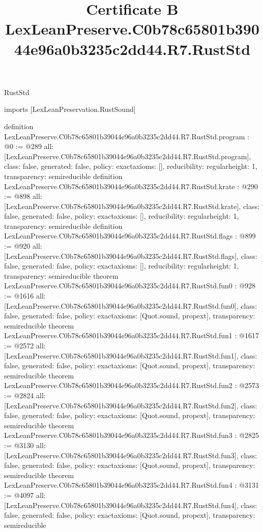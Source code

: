 \begin{lexlean}{RustStd}
\title{Certificate B LexLeanPreserve.C0b78c65801b39044e96a0b3235c2dd44.R7.RustStd}
\begin{coremodule}
imports [LexLeanPreservation.RustSound]

definition LexLeanPreserve.C0b78c65801b39044e96a0b3235c2dd44.R7.RustStd.program : @0 := @289 {
  all: [LexLeanPreserve.C0b78c65801b39044e96a0b3235c2dd44.R7.RustStd.program],
  class: false,
  generated: false,
  policy: exact{axioms: []},
  reducibility: regular{height: 1},
  transparency: semireducible
}
definition LexLeanPreserve.C0b78c65801b39044e96a0b3235c2dd44.R7.RustStd.krate : @290 := @898 {
  all: [LexLeanPreserve.C0b78c65801b39044e96a0b3235c2dd44.R7.RustStd.krate],
  class: false,
  generated: false,
  policy: exact{axioms: []},
  reducibility: regular{height: 1},
  transparency: semireducible
}
definition LexLeanPreserve.C0b78c65801b39044e96a0b3235c2dd44.R7.RustStd.flags : @899 := @920 {
  all: [LexLeanPreserve.C0b78c65801b39044e96a0b3235c2dd44.R7.RustStd.flags],
  class: false,
  generated: false,
  policy: exact{axioms: []},
  reducibility: regular{height: 1},
  transparency: semireducible
}
theorem LexLeanPreserve.C0b78c65801b39044e96a0b3235c2dd44.R7.RustStd.fun0 : @928 := @1616 {
  all: [LexLeanPreserve.C0b78c65801b39044e96a0b3235c2dd44.R7.RustStd.fun0],
  class: false,
  generated: false,
  policy: exact{axioms: [Quot.sound, propext]},
  transparency: semireducible
}
theorem LexLeanPreserve.C0b78c65801b39044e96a0b3235c2dd44.R7.RustStd.fun1 : @1617 := @2572 {
  all: [LexLeanPreserve.C0b78c65801b39044e96a0b3235c2dd44.R7.RustStd.fun1],
  class: false,
  generated: false,
  policy: exact{axioms: [Quot.sound, propext]},
  transparency: semireducible
}
theorem LexLeanPreserve.C0b78c65801b39044e96a0b3235c2dd44.R7.RustStd.fun2 : @2573 := @2824 {
  all: [LexLeanPreserve.C0b78c65801b39044e96a0b3235c2dd44.R7.RustStd.fun2],
  class: false,
  generated: false,
  policy: exact{axioms: [Quot.sound, propext]},
  transparency: semireducible
}
theorem LexLeanPreserve.C0b78c65801b39044e96a0b3235c2dd44.R7.RustStd.fun3 : @2825 := @3130 {
  all: [LexLeanPreserve.C0b78c65801b39044e96a0b3235c2dd44.R7.RustStd.fun3],
  class: false,
  generated: false,
  policy: exact{axioms: [Quot.sound, propext]},
  transparency: semireducible
}
theorem LexLeanPreserve.C0b78c65801b39044e96a0b3235c2dd44.R7.RustStd.fun4 : @3131 := @4097 {
  all: [LexLeanPreserve.C0b78c65801b39044e96a0b3235c2dd44.R7.RustStd.fun4],
  class: false,
  generated: false,
  policy: exact{axioms: [Quot.sound, propext]},
  transparency: semireducible
}
\end{coremodule}
\end{lexlean}
